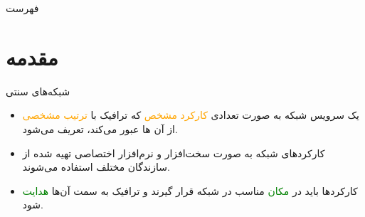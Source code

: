 \documentclass{beamer}
\makeatletter
\newcommand{\RTList}{\raggedleft\rightskip\@totalleftmargin}
\makeatother
\begin{document}
\begin{persian}
  {%
    \begin{frame}
      \titlepage%
    \end{frame}
  }

  \begin{frame}{فهرست}
    \tableofcontents[pausesections]
  \end{frame}

  \section{مقدمه}

  \begin{frame}{شبکه‌های سنتی}
    \begin{itemize}\RTList{}
      \justifying
      \item
            یک سرویس شبکه به صورت تعدادی
            \textcolor{orange}{کارکرد مشخص}
            که ترافیک با
            \textcolor{orange}{ترتیب مشخصی}
            از آن ها عبور می‌کند، تعریف می‌شود.
      \item
            کارکردهای شبکه به صورت سخت‌افزار و نرم‌افزار اختصاصی تهیه شده
            از سازندگان مختلف استفاده می‌شوند.
      \item
            کارکردها باید در \textcolor{green}{مکان} مناسب در شبکه قرار گیرند و ترافیک به سمت
            آن‌ها \textcolor{green}{هدایت} شود.
    \end{itemize}
  \end{frame}


\end{persian}
\end{document}
